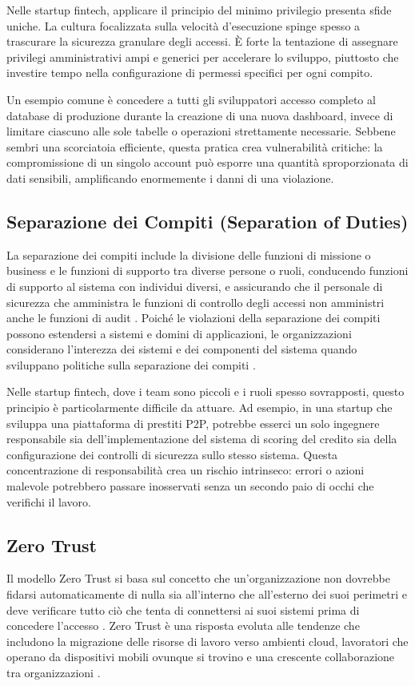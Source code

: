 \documentclass[a4paper,12pt]{report}
\begin{document}
Nelle startup fintech, applicare il principio del minimo privilegio presenta sfide uniche. La cultura focalizzata sulla velocità d'esecuzione spinge spesso a trascurare la sicurezza granulare degli accessi. È forte la tentazione di assegnare privilegi amministrativi ampi e generici per accelerare lo sviluppo, piuttosto che investire tempo nella configurazione di permessi specifici per ogni compito.

Un esempio comune è concedere a tutti gli sviluppatori accesso completo al database di produzione durante la creazione di una nuova dashboard, invece di limitare ciascuno alle sole tabelle o operazioni strettamente necessarie. Sebbene sembri una scorciatoia efficiente, questa pratica crea vulnerabilità critiche: la compromissione di un singolo account può esporre una quantità sproporzionata di dati sensibili, amplificando enormemente i danni di una violazione.

\subsection{Separazione dei Compiti (Separation of Duties)}
La separazione dei compiti include la divisione delle funzioni di missione o business e le funzioni di supporto tra diverse persone o ruoli, conducendo funzioni di supporto al sistema con individui diversi, e assicurando che il personale di sicurezza che amministra le funzioni di controllo degli accessi non amministri anche le funzioni di audit \cite{OSCAL_Content}. Poiché le violazioni della separazione dei compiti possono estendersi a sistemi e domini di applicazioni, le organizzazioni considerano l'interezza dei sistemi e dei componenti del sistema quando sviluppano politiche sulla separazione dei compiti \cite{OSCAL_Content}.

Nelle startup fintech, dove i team sono piccoli e i ruoli spesso sovrapposti, questo principio è particolarmente difficile da attuare. Ad esempio, in una startup che sviluppa una piattaforma di prestiti P2P, potrebbe esserci un solo ingegnere responsabile sia dell'implementazione del sistema di scoring del credito sia della configurazione dei controlli di sicurezza sullo stesso sistema. Questa concentrazione di responsabilità crea un rischio intrinseco: errori o azioni malevole potrebbero passare inosservati senza un secondo paio di occhi che verifichi il lavoro.

\subsection{Zero Trust}
Il modello Zero Trust si basa sul concetto che un'organizzazione non dovrebbe fidarsi automaticamente di nulla sia all'interno che all'esterno dei suoi perimetri e deve verificare tutto ciò che tenta di connettersi ai suoi sistemi prima di concedere l'accesso \cite{NIST_SP_800_207}. Zero Trust è una risposta evoluta alle tendenze che includono la migrazione delle risorse di lavoro verso ambienti cloud, lavoratori che operano da dispositivi mobili ovunque si trovino e una crescente collaborazione tra organizzazioni \cite{NIST_SP_800_207}.
\end{document}
